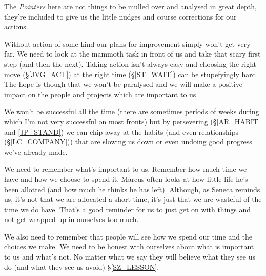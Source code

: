 \cleardoublepage
{\small

The \emph{Pointers} here are not things to be mulled over and analysed in great depth, they're included to give us the little nudges and course corrections for our actions.

Without action of some kind our plans for improvement simply won't get very far. We need to look at the mammoth task in front of us and take that scary first step (and then the next). 
Taking action isn't always easy and choosing the right move (\S \ref{JVG_ACT}) at the right time (\S \ref{ST_WAIT}) can be stupefyingly hard.
The hope is though that we won't be paralysed and we will make a positive impact on the people and projects which are important to us.

We won't be successful all the time (there are sometimes periods of weeks during which I'm not very successful on most fronts) but by persevering (\S \ref{AR_HABIT} and \ref{JP_STAND}) we can chip away at the habits (and even relationships (\S \ref{LC_COMPANY})) that are slowing us down or even undoing good progress we've already made.

We need to remember what's important to us. Remember how much time we have and how we choose to spend it. Marcus often looks at how little life he's been allotted (and how much he thinks he has left). Although, as Seneca reminds us, it's not that we are allocated a short time, it's just that we are wasteful of the time we do have. That's a good reminder for us to just get on with things and not get wrapped up in ourselves too much. 

We also need to remember that people will see how we spend our time and the choices we make. We need to be honest with ourselves about what is important to us and what's not. No matter what we say they will believe what they see us do (and what they see us avoid) \S \ref{SZ_LESSON}. 

}
